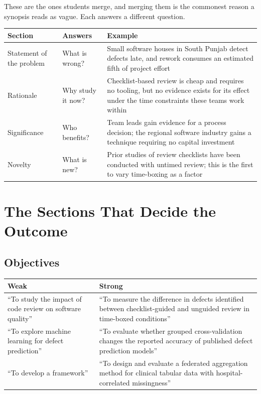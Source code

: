 \begin{alertbox}
These are the ones students merge, and merging them is the commonest reason a
synopsis reads as vague. Each answers a different question.

\begin{center}
\small
\begin{tabular}{@{}L{3.0cm}L{4.0cm}L{6.9cm}@{}}
\toprule
\textbf{Section} & \textbf{Answers} & \textbf{Example} \\
\midrule
Statement of the problem
  & What is wrong?
  & Small software houses in South Punjab detect defects late, and rework
    consumes an estimated fifth of project effort \\
Rationale
  & Why study it now?
  & Checklist-based review is cheap and requires no tooling, but no evidence
    exists for its effect under the time constraints these teams work within \\
Significance
  & Who benefits?
  & Team leads gain evidence for a process decision; the regional software
    industry gains a technique requiring no capital investment \\
Novelty
  & What is new?
  & Prior studies of review checklists have been conducted with untimed
    review; this is the first to vary time-boxing as a factor \\
\bottomrule
\end{tabular}
\end{center}
\end{alertbox}

\section{The Sections That Decide the Outcome}

\subsection{Objectives}

\begin{center}
\small
\begin{tabular}{@{}L{6.4cm}L{7.9cm}@{}}
\toprule
\textbf{Weak} & \textbf{Strong} \\
\midrule
``To study the impact of code review on software quality''
  & ``To measure the difference in defects identified between checklist-guided
    and unguided review in time-boxed conditions'' \\
``To explore machine learning for defect prediction''
  & ``To evaluate whether grouped cross-validation changes the reported
    accuracy of published defect prediction models'' \\
``To develop a framework''
  & ``To design and evaluate a federated aggregation method for clinical
    tabular data with hospital-correlated missingness'' \\
\bottomrule
\end{tabular}
\end{center}

